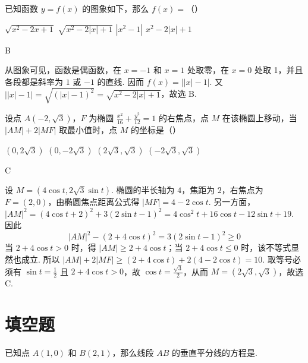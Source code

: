 \documentclass[UTF8,a4paper,oneside,11pt]{ctexbook}
\begin{document}
\begin{problem}
已知函数 \(y = f(x)\) 的图象如下，那么 \(f(x) =\)（\quad）


\choices
    {\(\sqrt{x^2 - 2x + 1}\)}
    {\(\sqrt{x^2 - 2|x| + 1}\)}
    {\(|x^2 - 1|\)}
    {\(x^2 - 2|x| + 1\)}
\end{problem}

\begin{answer}
B
\end{answer}

\begin{solution}
从图象可见，函数是偶函数，在 \(x=-1\) 和 \(x=1\) 处取零，在 \(x=0\) 处取 1，并且各段都是斜率为 \(1\) 或 \(-1\) 的直线. 因而 \(f(x)=\bigl||x|-1\bigr|\). 又 \(\bigl||x|-1\bigr|=\sqrt{(|x|-1)^2}=\sqrt{x^2-2|x|+1}\)，故选 B.
\end{solution}

\begin{problem}
设点 \(A(-2,\sqrt{3})\)，\(F\) 为椭圆 \(\frac{x^2}{16} + \frac{y^2}{12} = 1\) 的右焦点，点 \(M\) 在该椭圆上移动，当 \(|AM| + 2|MF|\) 取最小值时，点 \(M\) 的坐标是（\quad）

\choices
    {\((0,2\sqrt{3})\)}
    {\((0,-2\sqrt{3})\)}
    {\((2\sqrt{3},\sqrt{3})\)}
    {\((-2\sqrt{3},\sqrt{3})\)}
\end{problem}

\begin{answer}
C
\end{answer}

\begin{solution}
设 \(M=(4\cos t,2\sqrt3\sin t)\). 椭圆的半长轴为 \(4\)，焦距为 \(2\)，右焦点为 \(F=(2,0)\)，由椭圆焦点距离公式得 \(|MF|=4-2\cos t\). 另一方面，\(|AM|^2=(4\cos t+2)^2+3(2\sin t-1)^2=4\cos^2t+16\cos t-12\sin t+19\). 因此
\[
|AM|^2-(2+4\cos t)^2=3(2\sin t-1)^2\geqslant0
\]
当 \(2+4\cos t>0\) 时，得 \(|AM|\geqslant2+4\cos t\)；当 \(2+4\cos t\leqslant0\) 时，该不等式显然也成立. 所以 \(|AM|+2|MF|\geqslant(2+4\cos t)+2(4-2\cos t)=10\). 取等号必须有 \(\sin t=\frac12\) 且 \(2+4\cos t>0\)，故 \(\cos t=\frac{\sqrt3}{2}\)，从而 \(M=(2\sqrt3,\sqrt3)\)，故选 C.
\end{solution}

\section{填空题}

\begin{problem}
已知点 \(A(1,0)\) 和 \(B(2,1)\)，那么线段 \(AB\) 的垂直平分线的方程是\fillinblank{}.
\end{problem}
\end{document}
